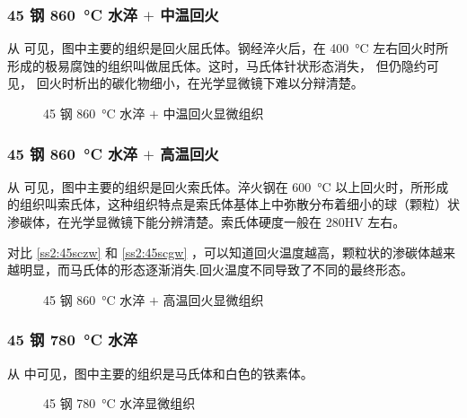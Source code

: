 \documentclass[a4paper,utf8]{article}
\begin{document}
        \subsubsection{45 钢 \SI{860}{\degreeCelsius} 水淬 $+$ 中温回火\label{ss2:45sczw}}
            从 可见，图中主要的组织是回火屈氏体。钢经淬火后，在 \SI{400}{\degreeCelsius} 左右回火时所形成的极易腐蚀的组织叫做屈氏体。这时，马氏体针状形态消失， 但仍隐约可见， 回火时析出的碳化物细小，在光学显微镜下难以分辩清楚。
            \begin{figure}[!ht]
                \hspace{20pt}
                \caption{45 钢 \SI{860}{\degreeCelsius} 水淬 $+$ 中温回火显微组织\label{fig:n8}}
            \end{figure}

        \subsubsection{45 钢 \SI{860}{\degreeCelsius} 水淬 $+$ 高温回火\label{ss2:45scgw}}
            从 可见，图中主要的组织是回火索氏体。淬火钢在 \SI{600}{\degreeCelsius} 以上回火时，所形成的组织叫索氏体，这种组织特点是索氏体基体上中弥散分布着细小的球（颗粒）状渗碳体，在光学显微镜下能分辨清楚。索氏体硬度一般在 280HV 左右。\par
            对比 \ref{ss2:45sczw} 和 \ref{ss2:45scgw} ，可以知道回火温度越高，颗粒状的渗碳体越来越明显，而马氏体的形态逐渐消失.回火温度不同导致了不同的最终形态。
            \begin{figure}[!ht]
                \hspace{20pt}
                \caption{45 钢 \SI{860}{\degreeCelsius} 水淬 $+$ 高温回火显微组织\label{fig:n9}}
            \end{figure}

        \subsubsection{45 钢 \SI{780}{\degreeCelsius} 水淬\label{ss2:45_780}}
            从 中可见，图中主要的组织是马氏体和白色的铁素体。
            \begin{figure}[!ht]
                \hspace{20pt}
                \caption{45 钢 \SI{780}{\degreeCelsius} 水淬显微组织\label{fig:n10}}
            \end{figure}
\end{document}
